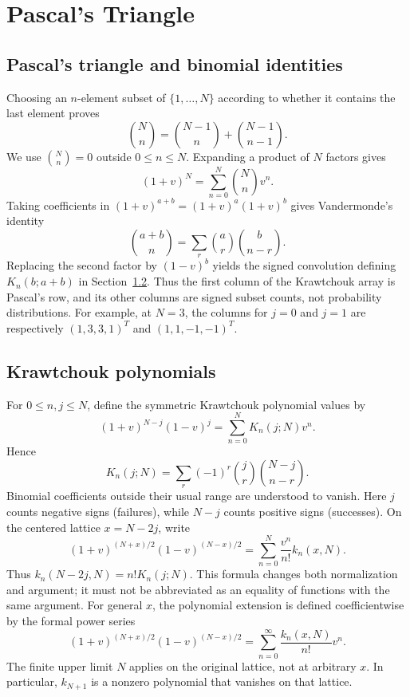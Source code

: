 \chapter{Pascal's Triangle}
\label{ch:1}
\section{Pascal's triangle and binomial identities}
\label{sec:1-1}
Choosing an $n$-element subset of $\{1,\ldots,N\}$ according to whether it contains the last element proves
\begin{equation}\label{eq:pascal-subsets}
\binom Nn=\binom{N-1}n+\binom{N-1}{n-1}.
\end{equation}
We use $\binom Nn=0$ outside $0\le n\le N$. Expanding a product of $N$ factors gives
\[
(1+v)^N=\sum_{n=0}^N\binom Nn v^n.
\]
Taking coefficients in $(1+v)^{a+b}=(1+v)^a(1+v)^b$ gives Vandermonde's identity
\[
\binom{a+b}n=\sum_r\binom ar\binom b{n-r}.
\]
Replacing the second factor by $(1-v)^b$ yields the signed convolution defining $K_n(b;a+b)$ in Section~\ref{sec:1-2}. Thus the first column of the Krawtchouk array is Pascal's row, and its other columns are signed subset counts, not probability distributions.
For example, at $N=3$, the columns for $j=0$ and $j=1$ are respectively $(1,3,3,1)^T$ and $(1,1,-1,-1)^T$.

\section{Krawtchouk polynomials}
\label{sec:1-2}
For $0\leq n,j\leq N$, define the symmetric Krawtchouk polynomial values by
\begin{equation}\label{eq:gen}
(1+v)^{N-j}(1-v)^j=\sum_{n=0}^N K_n(j;N)v^n.
\end{equation}
Hence
\[
K_n(j;N)=\sum_r(-1)^r\binom jr\binom{N-j}{n-r}.
\]
Binomial coefficients outside their usual range are understood to vanish.
Here $j$ counts negative signs (failures), while $N-j$ counts positive signs (successes).
On the centered lattice $x=N-2j$, write
\[
(1+v)^{(N+x)/2}(1-v)^{(N-x)/2}
=\sum_{n=0}^N\frac{v^n}{n!}k_n(x,N).
\]
Thus $k_n(N-2j,N)=n!K_n(j;N)$. This formula changes both
normalization and argument; it must not be abbreviated as an equality
of functions with the same argument. For general $x$, the polynomial
extension is defined coefficientwise by the formal power series
\[
(1+v)^{(N+x)/2}(1-v)^{(N-x)/2}
=\sum_{n=0}^{\infty}\frac{k_n(x,N)}{n!}v^n.
\]
The finite upper limit $N$ applies on the original lattice, not at
arbitrary $x$. In particular, $k_{N+1}$ is a nonzero polynomial that
vanishes on that lattice.

